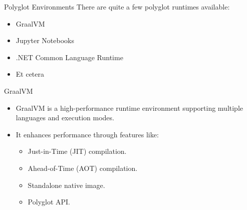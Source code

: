 \begin{frame}
    \centering
    \textbf{}
\end{frame}

\begin{frame}{Polyglot Environments}
    There are quite a few polyglot runtimes available:
    \vspace{2mm}
    \begin{itemize}
        \item GraalVM
        \vspace{2mm}
        \item Jupyter Notebooks
        \vspace{2mm}
        \item .NET Common Language Runtime
        \vspace{2mm}
        \item Et cetera
    \end{itemize}
\end{frame}

\begin{frame}{GraalVM}
    \begin{itemize}
        \item GraalVM is a high-performance runtime environment supporting multiple languages and execution modes.
        \vspace{2mm}
        \item It enhances performance through features like:
        \begin{itemize}
            \vspace{2mm}
            \item Just-in-Time (JIT) compilation.
            \vspace{2mm}
            \item Ahead-of-Time (AOT) compilation.
            \vspace{2mm}
            \item Standalone native image.
            \vspace{2mm}
            \item Polyglot API.
        \end{itemize}
    \end{itemize}
\end{frame}

